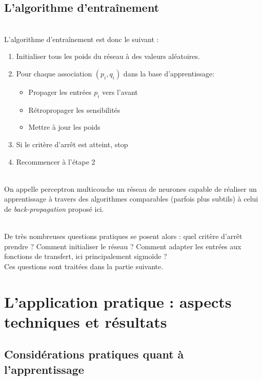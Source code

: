 \documentclass[a4paper, 11pt]{article}
\begin{document}
\subsection{L'algorithme d'entraînement}

\\ L'algorithme d'entraînement est donc le suivant : 

\begin{enumerate}

\item Initialiser tous les poids du réseau à des valeurs aléatoires.
\item Pour chaque association $(p_i,q_i)$ dans la base d’apprentissage:
\begin{itemize}
	\item Propager les entrées $p_i$ vers l'avant
	\item Rétropropager les sensibilités
	\item Mettre à jour les poids
\end{itemize}
\item Si le critère d'arrêt est atteint, stop
\item Recommencer à l'étape 2
\end{enumerate}


\\On appelle perceptron multicouche un réseau de neurones capable de réaliser un apprentissage à travers des algorithmes comparables (parfois plus subtils) à celui de \emph{back-propagation} proposé ici.

\\De très nombreuses questions pratiques se posent alors : quel critère d'arrêt prendre ? Comment initialiser le réseau ? Comment adapter les entrées aux fonctions de transfert, ici principalement sigmoïde ?
\\Ces questions sont traitées dans la partie suivante.

\section{L'application pratique : aspects techniques et résultats}

\subsection{Considérations pratiques quant à l'apprentissage}
\end{document}
